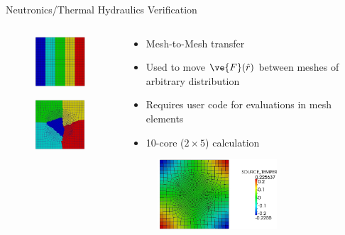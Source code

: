 \documentclass{beamer}
\begin{document}
\begin{frame}{Neutronics/Thermal Hydraulics Verification}

  \begin{columns}
    
    \begin{column}{0.5\textwidth}
      \begin{figure}
      \centering
      \includegraphics[width=1.25in]{neutronics_parallel_decomp.png}
      \end{figure}

      \begin{figure}
      \centering
      \includegraphics[width=1.25in]{cfd_parallel_decomp.png}
      \end{figure}
    \end{column}

    \begin{column}{0.5\textwidth}
      \begin{itemize}
      \item Mesh-to-Mesh transfer
        \medskip
      \item Used to move $\ve{F}(\hat{r})$ between meshes of arbitrary
        distribution
        \medskip
      \item Requires user code for evaluations in mesh elements
        \medskip
      \item 10-core ($2 \times 5$) calculation
      \end{itemize}

      \begin{figure}
      \centering
      \includegraphics[width=1.75in]{cfd_transferred_field.png}
      \end{figure}
    \end{column}

  \end{columns}

\end{frame}
\end{document}
